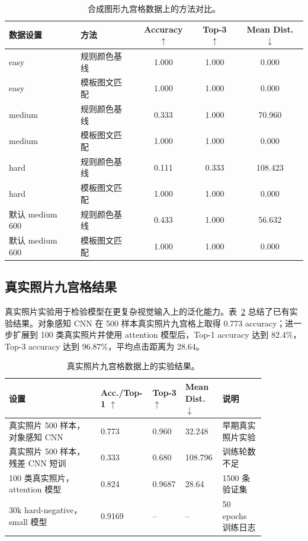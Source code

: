 \documentclass[UTF8,a4paper,12pt,fontset=fandol]{ctexart}
\begin{document}
\begin{table}[H]
  \centering
  \caption{合成图形九宫格数据上的方法对比。}
  \label{tab:synthetic}
  \begin{tabular}{llccc}
    \toprule
    \rowcolor{tablehead}
    数据设置 & 方法 & Accuracy $\uparrow$ & Top-3 $\uparrow$ & Mean Dist. $\downarrow$ \\
    \midrule
    easy & 规则颜色基线 & 1.000 & 1.000 & 0.000 \\
    easy & 模板图文匹配 & 1.000 & 1.000 & 0.000 \\
    medium & 规则颜色基线 & 0.333 & 1.000 & 70.960 \\
    medium & 模板图文匹配 & 1.000 & 1.000 & 0.000 \\
    hard & 规则颜色基线 & 0.111 & 0.333 & 108.423 \\
    hard & 模板图文匹配 & 1.000 & 1.000 & 0.000 \\
    默认 medium 600 & 规则颜色基线 & 0.433 & 1.000 & 56.632 \\
    默认 medium 600 & 模板图文匹配 & 1.000 & 1.000 & 0.000 \\
    \bottomrule
  \end{tabular}
\end{table}

\subsection{真实照片九宫格结果}

真实照片实验用于检验模型在更复杂视觉输入上的泛化能力。表~\ref{tab:photo} 总结了已有实验结果。对象感知 CNN 在 500 样本真实照片九宫格上取得 0.773 accuracy；进一步扩展到 100 类真实照片并使用 attention 模型后，Top-1 accuracy 达到 82.4\%，Top-3 accuracy 达到 96.87\%，平均点击距离为 28.64。

\begin{table}[H]
  \centering
  \caption{真实照片九宫格数据上的实验结果。}
  \label{tab:photo}
  \scriptsize
  \begin{tabular}{p{0.34\linewidth}p{0.13\linewidth}p{0.10\linewidth}p{0.13\linewidth}p{0.16\linewidth}}
    \toprule
    \rowcolor{tablehead}
    设置 & Acc./Top-1 $\uparrow$ & Top-3 $\uparrow$ & Mean Dist. $\downarrow$ & 说明 \\
    \midrule
    真实照片 500 样本，对象感知 CNN & 0.773 & 0.960 & 32.248 & 早期真实照片实验 \\
    真实照片 500 样本，残差 CNN 短训 & 0.333 & 0.680 & 108.796 & 训练轮数不足 \\
    100 类真实照片，attention 模型 & 0.824 & 0.9687 & 28.64 & 1500 条验证集 \\
    30k hard-negative，small 模型 & 0.9169 & -- & -- & 50 epochs 训练日志 \\
    \bottomrule
  \end{tabular}
\end{table}
\end{document}
